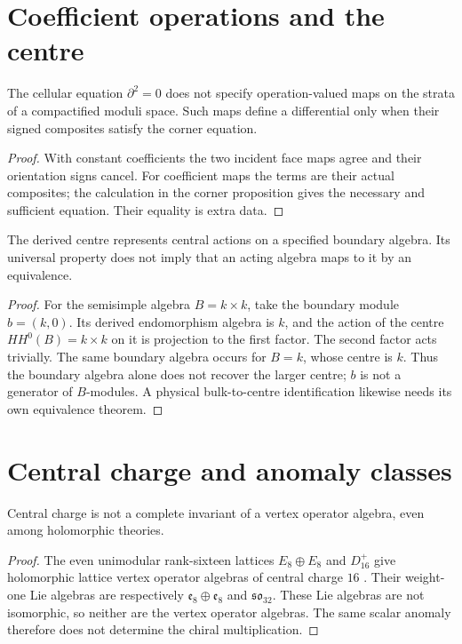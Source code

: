\section{Coefficient operations and the centre}
\begin{proposition}
The cellular equation $\partial^2=0$ does not specify operation-valued maps
on the strata of a compactified moduli space. Such maps define a differential
only when their signed composites satisfy the corner equation.
\end{proposition}
\begin{proof}
With constant coefficients the two incident face maps agree and their
orientation signs cancel. For coefficient maps the terms are their actual
composites; the calculation in the corner proposition gives the necessary
and sufficient equation. Their equality is extra data.
\end{proof}

\begin{proposition}
The derived centre represents central actions on a specified boundary algebra.
Its universal property does not imply that an acting algebra maps to it by
an equivalence.
\end{proposition}
\begin{proof}
For the semisimple algebra $B=k\times k$, take the boundary module $b=(k,0)$.
Its derived endomorphism algebra is $k$, and the action of the centre
$HH^0(B)=k\times k$ on it is projection to the first factor.
The second factor acts trivially. The same boundary algebra occurs for $B=k$,
whose centre is $k$. Thus the boundary algebra alone does not recover the
larger centre; $b$ is not a generator of $B$-modules.
A physical bulk-to-centre identification likewise needs its own equivalence theorem.
\end{proof}

\section{Central charge and anomaly classes}
\begin{proposition}
Central charge is not a complete invariant of a vertex operator algebra,
even among holomorphic theories.
\end{proposition}
\begin{proof}
The even unimodular rank-sixteen lattices $E_8\oplus E_8$ and $D_{16}^{+}$
give holomorphic lattice vertex operator algebras of central charge $16$
\cite{DongMasonSmall}. Their weight-one Lie algebras are respectively
$\mathfrak e_8\oplus\mathfrak e_8$ and $\mathfrak{so}_{32}$.
These Lie algebras are not isomorphic, so neither are the vertex operator algebras.
The same scalar anomaly therefore does not determine the chiral multiplication.
\end{proof}

